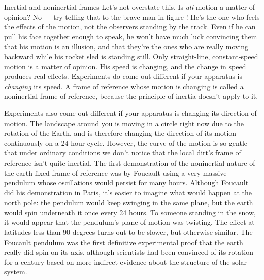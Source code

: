 %
\begin{envsubsection}{Inertial and noninertial frames}
Let's not overstate this. Is \emph{all} motion a matter of opinion? No --- try telling
that%
to the brave man in figure ! He's the one who feels the effects of the motion,
not the observers standing by the track. Even if he can pull his face together enough to
speak, he won't have much luck convincing them that his motion is an illusion, and that they're
the ones who are really moving backward while his rocket sled is standing still.
Only straight-line, constant-speed motion is a matter of opinion. His speed is changing, and
the change in speed produces real effects. Experiments do come out different if your apparatus
is \emph{changing} its speed. A frame of reference whose motion is changing is called a
noninertial frame of reference, because the principle of inertia doesn't apply to it.


Experiments also come out different if your apparatus is changing its direction of motion.
The landscape around you is moving in a circle right now due to the rotation
of the Earth, and is therefore changing the direction of its motion continuously
on a 24-hour cycle. However, the curve of the motion is so gentle that under
ordinary conditions we don't notice that the local dirt's frame of reference isn't
quite inertial. The first demonstration of the noninertial nature of the earth-fixed
frame of reference was by Foucault
 using a very massive pendulum whose oscillations
would persist for many hours. Although Foucault did
his demonstration in Paris, it's easier to imagine what would happen at the north pole:
the pendulum would keep swinging in the same plane, but the earth would spin underneath
it once every 24 hours. To someone standing in the snow, it would appear that the
pendulum's plane of motion was twisting. The effect at latitudes less than 90
degrees turns out to be slower, but otherwise similar. The Foucault pendulum was
the first definitive experimental proof that the earth really did spin on its axis,
although scientists had been convinced of its rotation for a century based on more
indirect evidence about the structure of the solar system.


\end{envsubsection}
